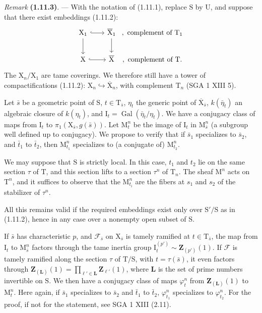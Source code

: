 \documentclass[11pt,leqno]{article}
\begin{document}
\textit{Remark} \textbf{(1.11.3)}. — With the notation of (1.11.1), replace \(\mathrm{S}\) by \(\mathrm{U}\), and suppose that there exist embeddings (1.11.2):
\[
\begin{tikzcd}[column sep=2em,row sep=2em]
\mathrm{X}_1 \arrow[r,hook] \arrow[d]
  & \overline{\mathrm{X}}_1 \arrow[d]
  &[-2em] {,\ \text{complement of }\mathrm{T}_1} \\
\mathrm{X} \arrow[r,hook]
  & \overline{\mathrm{X}}
  &[-2em] {,\ \text{complement of }\mathrm{T}.}
\end{tikzcd}
\]
The \(\mathrm{X}_n/\mathrm{X}_1\) are tame coverings. We therefore still have a tower of compactifications (1.11.2): \(\mathrm{X}_n\hookrightarrow\overline{\mathrm{X}}_n\), with complement \(\mathrm{T}_n\) (SGA 1 XIII 5).

Let \(\bar{s}\) be a geometric point of \(\mathrm{S}\), \(t\in\mathrm{T}_{\bar{s}}\), \(\eta_t\) the generic point of \(\overline{\mathrm{X}}_{\bar{s}}\), \(k(\bar{\eta}_t)\) an algebraic closure of \(k(\eta_t)\), and \(\mathrm{I}_t=\operatorname{Gal}(\bar{\eta}_t/\eta_t)\). We have a conjugacy class of maps from \(\mathrm{I}_t\) to \(\pi_1(\mathrm{X}_{\bar{s}},g(\bar{s}))\). Let \(\mathrm{M}_t^n\) be the image of \(\mathrm{I}_t\) in \(\mathrm{M}_{\bar{s}}^n\) (a subgroup well defined up to conjugacy). We propose to verify that if \(\bar{s}_1\) specializes to \(\bar{s}_2\), and \(\bar{t}_1\) to \(\bar{t}_2\), then \(\mathrm{M}_{t_1}^n\) specializes to (a conjugate of) \(\mathrm{M}_{t_2}^n\).

We may suppose that \(\mathrm{S}\) is strictly local. In this case, \(t_1\) and \(t_2\) lie on the same section \(\tau\) of \(\mathrm{T}\), and this section lifts to a section \(\tau^n\) of \(\mathrm{T}_n\). The sheaf \(\mathrm{M}^n\) acts on \(\mathrm{T}^n\), and it suffices to observe that the \(\mathrm{M}_{t_i}^n\) are the fibers at \(s_1\) and \(s_2\) of the stabilizer of \(\tau^n\).

All this remains valid if the required embeddings exist only over \(\mathrm{S}'/\mathrm{S}\) as in (1.11.2), hence in any case over a nonempty open subset of \(\mathrm{S}\).

If \(\bar{s}\) has characteristic \(p\), and \(\mathscr{F}_{\bar{s}}\) on \(\mathrm{X}_{\bar{s}}\) is tamely ramified at \(t\in\mathrm{T}_{\bar{s}}\), the map from \(\mathrm{I}_t\) to \(\mathrm{M}_{\bar{s}}^n\) factors through the tame inertia group \(\mathrm{I}_t^{(p')}\sim\mathbf{Z}_{(p')}(1)\). If \(\mathscr{F}\) is tamely ramified along the section \(\tau\) of \(\mathrm{T}/\mathrm{S}\), with \(t=\tau(\bar{s})\), it even factors through \(\mathbf{Z}_{(\mathbf{L})}(1)=\displaystyle\prod_{\ell'\in\mathbf{L}}\mathbf{Z}_{\ell'}(1)\), where \(\mathbf{L}\) is the set of prime numbers invertible on \(\mathrm{S}\). We then have a conjugacy class of maps \(\varphi_t^n\) from \(\mathbf{Z}_{(\mathbf{L})}(1)\) to \(\mathrm{M}_t^n\). Here again, if \(\bar{s}_1\) specializes to \(\bar{s}_2\) and \(\bar{t}_1\) to \(\bar{t}_2\), \(\varphi_{t_1}^n\) specializes to \(\varphi_{t_2}^n\). For the proof, if not for the statement, see SGA 1 XIII (2.11).
\end{document}
